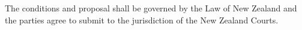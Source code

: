 \documentclass[nz-terms]{subfiles}
\begin{document}
The conditions and proposal shall be governed by the Law of New Zealand and the
parties agree to submit to the jurisdiction of the New Zealand Courts.
\end{document}
